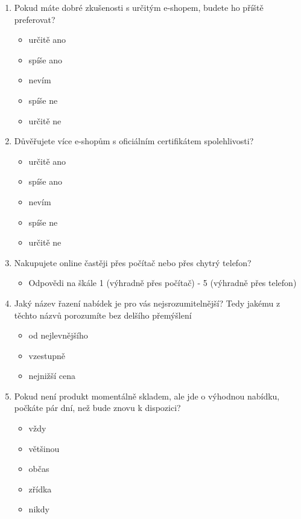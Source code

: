 \documentclass[12pt,oneside,openany]{fithesis}
\begin{document}
\begin{enumerate}
  \item Pokud máte dobré zkušenosti s určitým e-shopem, budete ho příště preferovat?
    \begin{itemize}
       \item určitě ano
       \item spíše ano
       \item nevím
       \item spíše ne
       \item určitě ne
    \end{itemize}

  \item Důvěřujete více e-shopům s oficiálním certifikátem spolehlivosti?
    \begin{itemize}
       \item určitě ano
       \item spíše ano
       \item nevím
       \item spíše ne
       \item určitě ne
    \end{itemize}

  \item Nakupujete online častěji přes počítač nebo přes chytrý telefon?
    \begin{itemize}
        \item Odpovědi na škále 1 (výhradně přes počítač) - 5 (výhradně přes telefon)
    \end{itemize}

  \item Jaký název řazení nabídek je pro vás nejsrozumitelnější? Tedy jakému z těchto názvů porozumíte bez delšího přemýšlení
    \begin{itemize}
       \item od nejlevnějšího
       \item vzestupně
       \item nejnižší cena
    \end{itemize}

  \item Pokud není produkt momentálně skladem, ale jde o výhodnou nabídku, počkáte pár dní, než bude znovu k dispozici?
    \begin{itemize}
       \item vždy
       \item většinou
       \item občas
       \item zřídka
       \item nikdy
    \end{itemize}


\end{enumerate}
\end{document}
